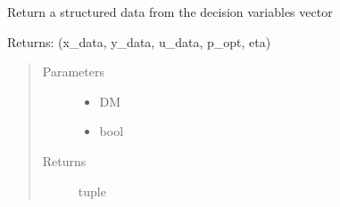 \documentclass[letterpaper,10pt,english]{sphinxmanual}
\begin{document}
\begin{fulllineitems}

\begin{fulllineitems}
\label{\detokenize{yaocptool.methods.classic:yaocptool.methods.classic.collocationscheme.CollocationScheme.time_interpolation_controls}}
\end{fulllineitems}


\begin{fulllineitems}
\label{\detokenize{yaocptool.methods.classic:yaocptool.methods.classic.collocationscheme.CollocationScheme.time_interpolation_states}}
\end{fulllineitems}


\begin{fulllineitems}
\label{\detokenize{yaocptool.methods.classic:yaocptool.methods.classic.collocationscheme.CollocationScheme.unpack_decision_variables}}
Return a structured data from the decision variables vector

Returns:
(x\_data, y\_data, u\_data, p\_opt, eta)
\begin{quote}\begin{description}
\item[{Parameters}] \leavevmode\begin{itemize}
\item {} 
 \textendash{} DM

\item {} 
 \textendash{} bool

\end{itemize}

\item[{Returns}] \leavevmode
tuple

\end{description}\end{quote}

\end{fulllineitems}


\end{fulllineitems}
\end{document}
